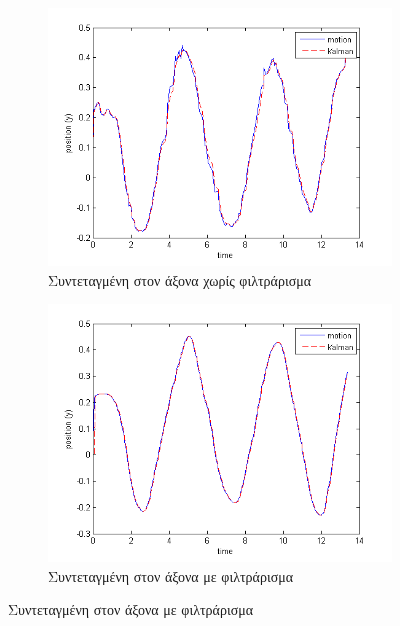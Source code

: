 \begin{figure}[H]
    \centering
    \begin{subfigure}[t]{.48\textwidth}
        \includegraphics[width=\textwidth, keepaspectratio]{fig/filter0-y.png}
        \caption{Συντεταγμένη στον  άξονα χωρίς φιλτράρισμα}
        \label{fig:filter0-y}
    \end{subfigure}
    \begin{subfigure}[t]{.48\textwidth}
        \includegraphics[width=\textwidth, keepaspectratio]{fig/filter3-y.png}
        \caption{Συντεταγμένη στον  άξονα με φιλτράρισμα}
        \label{fig:filter3-y}
    \end{subfigure}


\end{figure}

